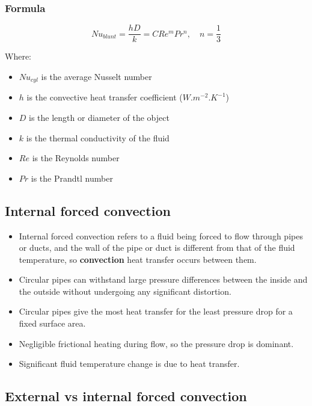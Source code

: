 \documentclass[11pt]{article}
\begin{document}
\subsubsection{Formula}
\label{sec:org9b68b87}
\[Nu_{blunt} = \frac{hD}{k} = C Re^m Pr^n, \quad n = \frac{1}{3}\]

Where:
\begin{itemize}
\item \(Nu_{cyl}\) is the average Nusselt number
\item \(h\) is the convective heat transfer coefficient (\(\unit{W.m^{-2}.K^{-1}}\))
\item \(D\) is the length or diameter of the object
\item \(k\) is the thermal conductivity of the fluid
\item \(Re\) is the Reynolds number
\item \(Pr\) is the Prandtl number
\end{itemize}

\subsection{Internal forced convection}
\label{sec:org504f5a2}
\begin{itemize}
\item Internal forced convection refers to a fluid being forced to flow through pipes or ducts, and the wall of the pipe or duct is different from that of the fluid temperature, so \textbf{convection} heat transfer occurs between them.
\item Circular pipes can withstand large pressure differences between the inside and the outside without undergoing any significant distortion.
\item Circular pipes give the most heat transfer for the least pressure drop for a fixed surface area.
\item Negligible frictional heating during flow, so the pressure drop is dominant.
\item Significant fluid temperature change is due to heat transfer.
\end{itemize}

 \newpage

\subsection{External vs internal forced convection}
\label{sec:orgb3abd42}
\end{document}
